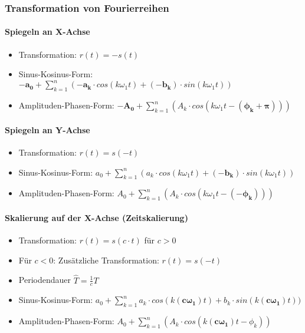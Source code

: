 \subsubsection{Transformation von Fourierreihen}
\paragraph{Spiegeln an X-Achse}
\begin{itemize}
  \item Transformation: $r(t) = -s(t)$
  \item Sinus-Kosinus-Form: $\boldsymbol{-a_0} + \sum_{k=1}^{n}
    (\boldsymbol{-a_k} \cdot cos(k \omega_1 t) +
    \boldsymbol{(-b_k)} \cdot sin(k \omega_1 t))$
  \item Amplituden-Phasen-Form: $\boldsymbol{-A_0} + \sum_{k=1}^{n}
    (A_k \cdot cos(k \omega_1 t  - \boldsymbol{(\phi_k + \pi)}))$
\end{itemize}
\paragraph{Spiegeln an Y-Achse}
\begin{itemize}
  \item Transformation: $r(t) = s(-t)$
  \item Sinus-Kosinus-Form: $a_0 + \sum_{k=1}^{n} ( a_k \cdot
    cos(k \omega_1 t) + \boldsymbol{(-b_k)} \cdot sin(k \omega_1 t))$
  \item Amplituden-Phasen-Form: $A_0 + \sum_{k=1}^{n}
    (A_k \cdot cos(k \omega_1 t  - \boldsymbol{(-\phi_k)}))$
\end{itemize}
\paragraph{Skalierung auf der X-Achse (Zeitskalierung)}
\begin{itemize}
  \item Transformation: $r(t) = s(c \cdot t)$ für $c > 0$
  \item Für $c < 0$: Zusätzliche Transformation: $r(t) = s(-t)$
  \item Periodendauer $\hat{T} = \frac{1}{c}T$
  \item Sinus-Kosinus-Form: $a_0 + \sum_{k=1}^{n}
    a_k \cdot cos(k \boldsymbol{(c \omega_1)} t) +
    b_k \cdot sin(k \boldsymbol{(c \omega_1)} t))$
  \item Amplituden-Phasen-Form: $A_0 + \sum_{k=1}^{n}
    (A_k \cdot cos(k \boldsymbol{(c \omega_1)} t  - \phi_k))$
\end{itemize}
